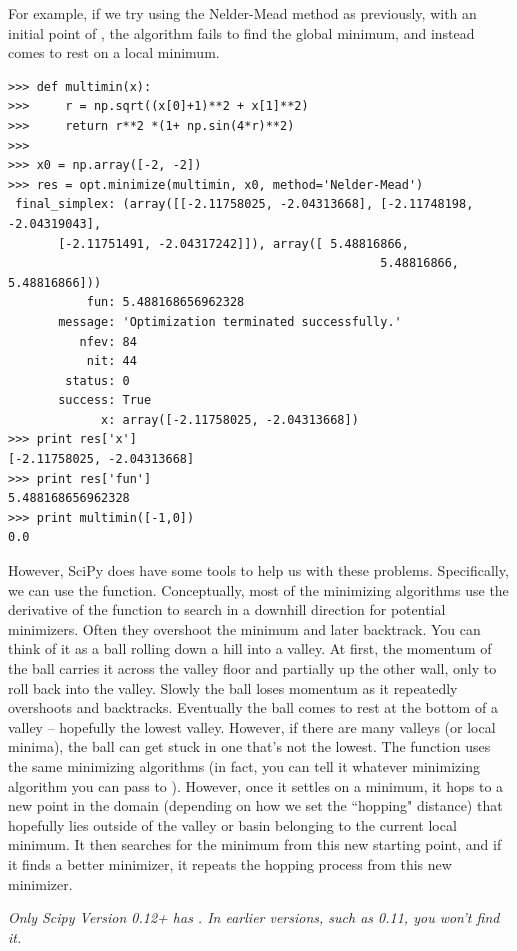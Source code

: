 For example, if we try using the Nelder-Mead method as previously, with an initial point of , the algorithm fails to find the global minimum, and instead comes to rest on a local minimum.
\begin{lstlisting}
>>> def multimin(x):
>>>     r = np.sqrt((x[0]+1)**2 + x[1]**2)
>>>     return r**2 *(1+ np.sin(4*r)**2)
>>>
>>> x0 = np.array([-2, -2])
>>> res = opt.minimize(multimin, x0, method='Nelder-Mead')
 final_simplex: (array([[-2.11758025, -2.04313668], [-2.11748198, -2.04319043],
       [-2.11751491, -2.04317242]]), array([ 5.48816866,  
       												5.48816866,  5.48816866]))
           fun: 5.488168656962328
       message: 'Optimization terminated successfully.'
          nfev: 84
           nit: 44
        status: 0
       success: True
             x: array([-2.11758025, -2.04313668])
>>> print res['x']
[-2.11758025, -2.04313668]
>>> print res['fun']
5.488168656962328
>>> print multimin([-1,0])
0.0
\end{lstlisting}

However, SciPy does have some tools to help us with these problems. Specifically, we can use the  function.
Conceptually, most of the minimizing algorithms use the derivative of the function to search in a downhill direction for potential minimizers.
Often they overshoot the minimum and later backtrack. You can think of it as a ball rolling down a hill into a valley.
At first, the momentum of the ball carries it across the valley floor and partially up the other wall, only to roll back into the valley.
Slowly the ball loses momentum as it repeatedly overshoots and backtracks. Eventually the ball comes to rest at the bottom of a valley -- hopefully the lowest valley.
However, if there are many valleys (or local minima), the ball can get stuck in one that's not the lowest.
The  function uses the same minimizing algorithms (in fact, you can tell it whatever minimizing algorithm you can pass to ).
However, once it settles on a minimum, it hops to a new point in the domain (depending on how we set the ``hopping" distance) that hopefully lies outside of the valley
or basin belonging to the current local minimum.
It then searches for the minimum from this new starting point, and if it finds a better minimizer, it repeats the hopping process from this new minimizer.

\emph{Only Scipy Version 0.12+ has . In earlier versions, such as 0.11, you won't find it.}

